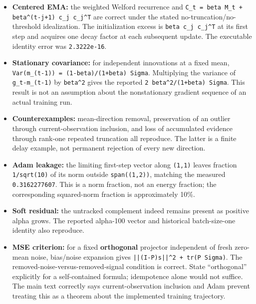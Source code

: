 \documentclass[
  british,
  10pt,
  a4paper,
]{article}
\providecommand{\tightlist}{%
  \setlength{\itemsep}{0pt}\setlength{\parskip}{0pt}}
\begin{document}
\begin{itemize}
\tightlist
\item
  \textbf{Centered EMA:} the weighted Welford recurrence and
  \texttt{C\_\allowbreak{}t \allowbreak{}=\allowbreak{} \allowbreak{}beta \allowbreak{}M\_\allowbreak{}t \allowbreak{}+ \allowbreak{}beta\textasciicircum{}(t-\allowbreak{}j+1) \allowbreak{}c\_\allowbreak{}j \allowbreak{}c\_\allowbreak{}j\textasciicircum{}T}
  are correct under the stated
  no-\allowbreak{}truncation/\allowbreak{}no-\allowbreak{}threshold
  idealization\allowbreak{}.\allowbreak{} The initialization excess is
  \texttt{beta \allowbreak{}c\_\allowbreak{}j \allowbreak{}c\_\allowbreak{}j\textasciicircum{}T}
  at its first step and acquires one decay factor at each subsequent
  update. The executable identity error was \texttt{2.3222e-16}.
\item
  \textbf{Stationary covariance:} for independent innovations at a fixed
  mean,
  \texttt{Var(m\_\allowbreak{}(t-\allowbreak{}1)) \allowbreak{}=\allowbreak{} \allowbreak{}(1-\allowbreak{}beta)/\allowbreak{}(1+beta) \allowbreak{}Sigma}.
  Multiplying the variance of
  \texttt{g\_\allowbreak{}t-\allowbreak{}m\_\allowbreak{}(t-\allowbreak{}1)}
  by \texttt{beta\^{}2} gives the reported
  \texttt{2 \allowbreak{}beta\textasciicircum{}2/\allowbreak{}(1+beta) \allowbreak{}Sigma}.
  This result is not an assumption about the nonstationary gradient
  sequence of an actual training run.
\item
  \textbf{Counterexamples:} mean-\allowbreak{}direction removal,
  preservation of an outlier through current-\allowbreak{}observation
  inclusion, and loss of accumulated evidence through rank-one repeated
  truncation all reproduce. The latter is a finite delay example, not
  permanent rejection of every new direction.
\item
  \textbf{Adam leakage:} the limiting first-step vector along
  \texttt{(1,1)} leaves fraction \texttt{1/sqrt(10)} of its norm outside
  \texttt{span((1,\allowbreak{}2))}, matching the measured
  \texttt{0.\allowbreak{}3162277607}. This is a norm fraction, not an
  energy fraction; the corresponding squared-\allowbreak{}norm fraction
  is approximately 10\%.
\item
  \textbf{Soft residual:} the untracked complement indeed remains
  present as positive alpha grows. The reported alpha-100 vector and
  historical batch-\allowbreak{}size-\allowbreak{}one identity also
  reproduce.
\item
  \textbf{MSE criterion:} for a fixed \textbf{orthogonal} projector
  independent of fresh zero-mean noise, bias/noise expansion gives
  \texttt{||(I-\allowbreak{}P)s||\textasciicircum{}2 \allowbreak{}+ \allowbreak{}tr(P \allowbreak{}Sigma)}.
  The
  removed-\allowbreak{}noise-\allowbreak{}versus-\allowbreak{}removed-\allowbreak{}signal
  condition is correct. State ``orthogonal'' explicitly for a
  self-\allowbreak{}contained formula; idempotence alone would not
  suffice. The main text correctly says current-\allowbreak{}observation
  inclusion and Adam prevent treating this as a theorem about the
  implemented training trajectory.\allowbreak{}
\end{itemize}
\end{document}
